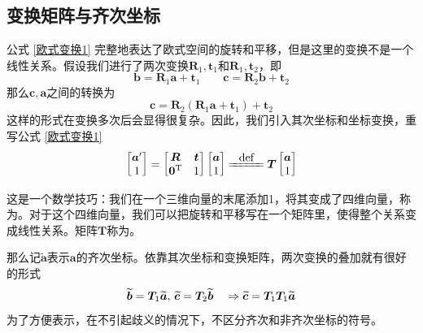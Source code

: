 \subsection{变换矩阵与齐次坐标}
公式 \eqref{欧式变换1} 完整地表达了欧式空间的旋转和平移，但是这里的变换不是一个线性关系。假设我们进行了两次变换$\bm{R}_1,\bm{t}_1$和$\bm{R}_1, \bm{t}_2$，即
\begin{equation*}
    \bm{b} = \bm{R}_1 \bm{a} + \bm{t}_1 \qquad \bm{c} = \bm{R}_2 \bm{b} + \bm{t}_2
\end{equation*}
那么$\bm{c},\bm{a}$之间的转换为
\begin{equation*}
    \bm{c} = \bm{R}_2 (\bm{R}_1 \bm{a} + \bm{t}_1) + \bm{t}_2
\end{equation*}
这样的形式在变换多次后会显得很复杂。因此，我们引入其次坐标和坐标变换，重写公式 \eqref{欧式变换1}
\begin{equation}
    \begin{bmatrix}
        \bm{a}'\\
        1
    \end{bmatrix}
    =
    \begin{bmatrix}
        \bm{R} & \bm{t} \\
        \bm{0}^{\text{T}} & 1
    \end{bmatrix}
    \begin{bmatrix}
        \bm{a} \\
        1
    \end{bmatrix}
    \xlongequal[]{\hspace*{0.5em}\text{\normalsize def}\hspace*{0.5em}}
    \bm{T}
    \begin{bmatrix}
        \bm{a}\\
        1
    \end{bmatrix}
\end{equation}

这是一个数学技巧：我们在一个三维向量的末尾添加1，将其变成了四维向量，称为。对于这个四维向量，我们可以把旋转和平移写在一个矩阵里，使得整个关系变成线性关系。矩阵$\bm{T}$称为。

那么记$\widetilde{\bm{a}}$表示$\bm{a}$的齐次坐标。依靠其次坐标和变换矩阵，两次变换的叠加就有很好的形式
\begin{equation}
    \widetilde{\bm{b}} = \bm{T}_1 \widetilde{\bm{a}},\, \widetilde{\bm{c}} = \bm{T}_2 \widetilde{\bm{b}} \quad \Rightarrow \widetilde{\bm{c}} = \bm{T}_1 \bm{T}_1 \widetilde{\bm{a}}
\end{equation}
为了方便表示，在不引起歧义的情况下，不区分齐次和非齐次坐标的符号。

